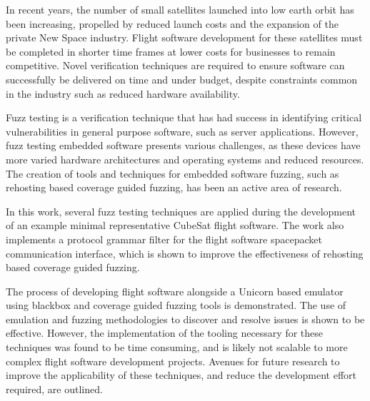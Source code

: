 \documentclass[../report.tex]{subfiles}
\begin{document}
In recent years, the number of small satellites launched into low earth orbit
has been increasing, propelled by reduced launch costs and the expansion of the
private New Space industry. Flight software development for these satellites
must be completed in shorter time frames at lower costs for businesses to
remain competitive. Novel verification techniques are required to ensure
software can successfully be delivered on time and under budget, despite
constraints common in the industry such as reduced hardware availability.

Fuzz testing is a verification technique that has had success in identifying
critical vulnerabilities in general purpose software, such as server
applications. However, fuzz testing embedded software presents various
challenges, as these devices have more varied hardware architectures and
operating systems and reduced resources. The creation of tools and techniques
for embedded software fuzzing, such as rehosting based coverage guided fuzzing,
has been an active area of research.

In this work, several fuzz testing techniques are applied during the
development of an example minimal representative CubeSat flight software. The
work also implements a protocol grammar filter for the flight software
spacepacket communication interface, which is shown to improve the
effectiveness of rehosting based coverage guided fuzzing.

The process of developing flight software alongside a Unicorn based emulator
using blackbox and coverage guided fuzzing tools is demonstrated. The use of
emulation and fuzzing methodologies to discover and resolve issues is shown to
be effective. However, the implementation of the tooling necessary for these
techniques was found to be time consuming, and is likely not scalable to more
complex flight software development projects. Avenues for future research to
improve the applicability of these techniques, and reduce the development
effort required, are outlined.
\end{document}

